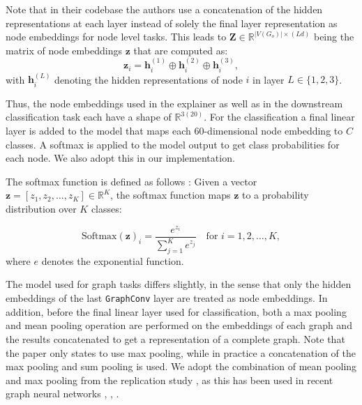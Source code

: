 Note that in their codebase the authors use a concatenation of the hidden representations at each layer instead of solely the final layer representation as node embeddings for node level tasks.
This leads to $\mathbf{Z} \in \mathbb{R}^{|V(G_o)|\times (Ld)}$ being the matrix of node embeddings $\mathbf{z}$ that are computed as:
\begin{equation}
    \mathbf{z}_i = \mathbf{h}^{(1)}_i \oplus \mathbf{h}^{(2)}_i \oplus \mathbf{h}^{(3)}_i,
\end{equation}
with $\mathbf{h}^{(L)}_i$ denoting the hidden representations of node $i$ in layer $L \in \{1,2,3\}$.\bigskip


Thus, the node embeddings used in the explainer as well as in the downstream classification task each have a shape of $\mathbb{R}^{3(20)}$. For the classification a final linear layer is added to the model that maps each $60$-dimensional node embedding to $C$ classes. A softmax is applied to the model output to get class probabilities for each node. We also adopt this in our implementation.

The softmax function is defined as follows \cite{Goodfellow-et-al-2016}:
Given a vector \( \mathbf{z} = [z_1, z_2, \dots, z_K] \in \mathbb{R}^K \), the softmax function maps \( \mathbf{z} \) to a probability distribution over \( K \) classes:

\begin{equation}
    \text{Softmax}(\mathbf{z})_i = \frac{e^{z_i}}{\sum_{j=1}^{K} e^{z_j}} \quad \text{for } i = 1, 2, \dots, K,
\end{equation}
where $e$ denotes the exponential function. \bigskip

The model used for graph tasks differs slightly, in the sense that only the hidden embeddings of the last \lstinline|GraphConv| layer are treated as node embeddings. In addition, before the final linear layer used for classification, both a max pooling and mean pooling operation are performed on the embeddings of each graph and the results concatenated to get a representation of a complete graph. Note that the paper only states to use max pooling, while in practice a concatenation of the max pooling and sum pooling is used. We adopt the combination of mean pooling and max pooling from the replication study \cite{holdijk2021re}, as this has been used in recent graph neural networks \cite{ma2021unsupervised}, \cite{simonovsky2017dynamic}, \cite{zhao2023faithful}. 

